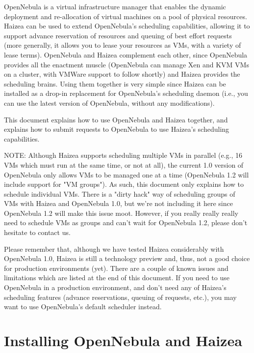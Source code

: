 OpenNebula is a virtual infrastructure manager that enables the dynamic deployment and re-allocation of virtual machines on a pool of physical resources. Haizea can be used to extend OpenNebula's scheduling capabilities, allowing it to support advance reservation of resources and queuing of best effort requests (more generally, it allows you to lease your resources as VMs, with a variety of lease terms). OpenNebula and Haizea complement each other, since OpenNebula provides all the enactment muscle (OpenNebula can manage Xen and KVM VMs on a cluster, with VMWare support to follow shortly) and Haizea provides the scheduling brains. Using them together is very simple since Haizea can be installed as a drop-in replacement for OpenNebula's scheduling daemon (i.e., you can use the latest version of OpenNebula, without any modifications).

This document explains how to use OpenNebula and Haizea together, and explains how to submit requests to OpenNebula to use Haizea's scheduling capabilities.

NOTE: Although Haizea supports scheduling multiple VMs in parallel (e.g., 16 VMs which must run at the same time, or not at all), the current 1.0 version of OpenNebula only allows VMs to be managed one at a time (OpenNebula 1.2 will include support for "VM groups"). As such, this document only explains how to schedule individual VMs. There is a "dirty hack" way of scheduling groups of VMs with Haizea and OpenNebula 1.0, but we're not including it here since OpenNebula 1.2 will make this issue moot. However, if you really really really need to schedule VMs as groups and can't wait for OpenNebula 1.2, please don't hesitate to contact us.

\begin{warning}
Please remember that, although we have tested Haizea considerably with OpenNebula 1.0, Haizea is still a technology preview and, thus, not a good choice for production environments (yet). There are a couple of known issues and limitations which are listed at the end of this document. If you need to use OpenNebula in a production environment, and don't need any of Haizea's scheduling features (advance reservations, queuing of requests, etc.), you may want to use OpenNebula's default scheduler instead.
\end{warning}

\section{Installing OpenNebula and Haizea}

